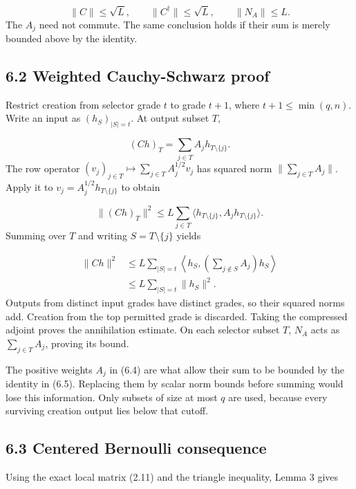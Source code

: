 \documentclass[11pt,a4paper]{article}
\begin{document}
\begin{equation}
\|C\|\le\sqrt L,\qquad
\|C^\dagger\|\le\sqrt L,\qquad
\|N_A\|\le L.
\tag{6.2}
\end{equation}
The \(A_j\) need not commute. The same conclusion holds if their sum is merely bounded above by the identity.

\subsection*{6.2 Weighted Cauchy-Schwarz proof}
Restrict creation from selector grade \(t\) to grade \(t+1\), where \(t+1\le\min(q,n)\). Write an input as \((h_S)_{|S|=t}\). At output subset \(T\),

\begin{equation}
(Ch)_T=\sum_{j\in T}A_jh_{T\setminus\{j\}}.
\tag{6.3}
\end{equation}
The row operator \((v_j)_{j\in T}\mapsto\sum_{j\in T}A_j^{1/2}v_j\) has squared norm \(\|\sum_{j\in T}A_j\|\). Apply it to \(v_j=A_j^{1/2}h_{T\setminus\{j\}}\) to obtain

\begin{equation}
\|(Ch)_T\|^2
\le L\sum_{j\in T}
\langle h_{T\setminus\{j\}},A_jh_{T\setminus\{j\}}\rangle .
\tag{6.4}
\end{equation}
Summing over \(T\) and writing \(S=T\setminus\{j\}\) yields

\begin{equation}
\begin{aligned}
\|Ch\|^2
&\le L\sum_{|S|=t}
\left\langle h_S,\left(\sum_{j\notin S}A_j\right)h_S\right\rangle\\
&\le L\sum_{|S|=t}\|h_S\|^2 .
\end{aligned}
\tag{6.5}
\end{equation}
Outputs from distinct input grades have distinct grades, so their squared norms add. Creation from the top permitted grade is discarded. Taking the compressed adjoint proves the annihilation estimate. On each selector subset \(T\), \(N_A\) acts as \(\sum_{j\in T}A_j\), proving its bound.

The positive weights \(A_j\) in (6.4) are what allow their sum to be bounded by the identity in (6.5). Replacing them by scalar norm bounds before summing would lose this information. Only subsets of size at most \(q\) are used, because every surviving creation output lies below that cutoff.

\subsection*{6.3 Centered Bernoulli consequence}
Using the exact local matrix (2.11) and the triangle inequality, Lemma 3 gives
\end{document}
